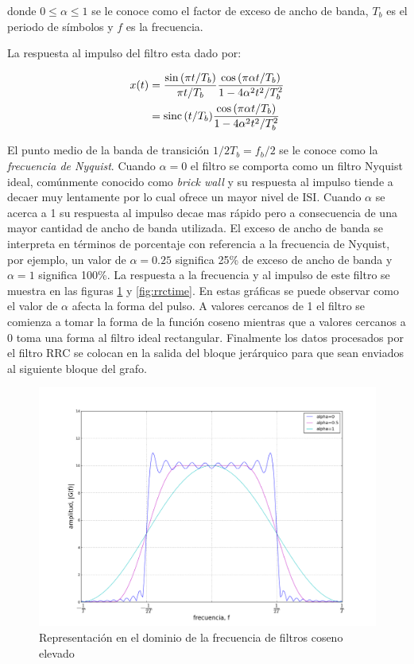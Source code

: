 donde $0 \leq \alpha \leq 1$ se le conoce como el factor de exceso de ancho de banda, $T_b$ es el
periodo de s\'imbolos y $f$ es la frecuencia. 

La respuesta al impulso del filtro esta dado por:

\begin{align}\label{eq:imptransfer}
x(t)&=\frac{\sin{(\pi t/T_b)}}{\pi t/T_b}\frac{\cos{(\pi\alpha t/T_b)}}{1-4\alpha^2t^2/T_b^2}
\nonumber \\ 
&=\operatorname{sinc}{(t/T_b)}\frac{\cos{(\pi \alpha t/T_b)}}{1-4\alpha^2t^2/T_b^2}
\end{align}

El punto medio de la banda de transici\'on $1/2T_b=f_b/2$ se le conoce como la \emph{frecuencia de
Nyquist}. Cuando $\alpha=0$ el filtro se comporta como un filtro Nyquist ideal, com\'unmente
conocido como \emph{brick wall} y su respuesta al impulso tiende a decaer muy lentamente por lo
cual ofrece un mayor nivel de ISI. Cuando $\alpha$ se acerca a 1 su respuesta al impulso decae mas
r\'apido pero a consecuencia de una mayor cantidad de ancho de banda utilizada. El exceso de ancho
de banda se interpreta en t\'erminos de porcentaje con referencia a la frecuencia de Nyquist, por
ejemplo, un valor de $\alpha=0.25$ significa 25\% de exceso de ancho de banda y $\alpha=1$
significa 100\%. La respuesta a la frecuencia y al impulso de este filtro se muestra en las figuras
\ref{fig:rrcfreq} y \ref{fig:rrctime}. En estas gr\'aficas se puede observar como el valor de $\alpha$ afecta la forma del
pulso. A valores cercanos de 1 el filtro se comienza a tomar la forma de la funci\'on coseno mientras que a valores
cercanos a 0 toma una forma al filtro ideal rectangular. Finalmente los datos procesados por el filtro RRC se colocan en la
salida del bloque jer\'arquico para que sean enviados al siguiente bloque del grafo.


\begin{figure}[htp]
  \centering
  \includegraphics[width=5.9in]{figs/rrcfreq}
  \vspace{0.3in}
  \caption{Representaci\'on en el dominio de la frecuencia de filtros coseno elevado}
  \label{fig:rrcfreq}
\end{figure}

